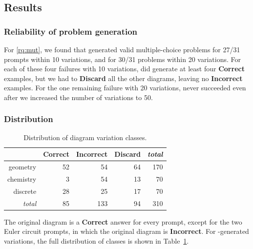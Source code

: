 \subsection{Results}

\subsubsection{Reliability of problem generation}

For \ref{rq:mut}, we found that \Edgeworth generated valid multiple-choice problems for 27/31 prompts within 10 variations, and for 30/31 problems within 20 variations. For each of these four failures with 10 variations, \Edgeworth did generate at least four \textbf{Correct} examples, but we had to \textbf{Discard} all the other diagrams, leaving no \textbf{Incorrect} examples. For the one remaining failure with 20 variations, \Edgeworth never succeeded even after we increased the number of variations to 50.


\subsubsection{Distribution}

\begin{table}
    \centering
    \begin{tabular}{r|rrr|r}
        & \textbf{Correct} & \textbf{Incorrect} & \textbf{Discard} & \textit{total} \\
        \hline
        geometry & 52 & 54 & 64 & 170 \\
        chemistry & 3 & 54 & 13 & 70 \\
        discrete & 28 & 25 & 17 & 70 \\
        \hline
        \textit{total} & 85 & 133 & 94 & 310
    \end{tabular}
    \caption{Distribution of diagram variation classes.}
    \label{tab:distribution}
\end{table}

The original diagram is a \textbf{Correct} answer for every prompt, except for the two Euler circuit prompts, in which the original diagram is \textbf{Incorrect}. For \Edgeworth-generated variations, the full distribution of classes is shown in Table~\ref{tab:distribution}.


